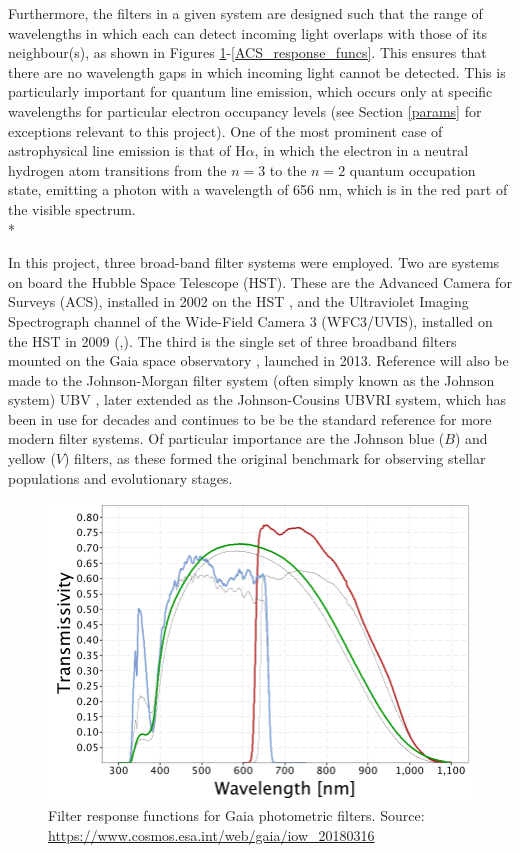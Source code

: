 \documentclass[12pt, a4paper]{report}
\begin{document}
Furthermore, the filters in a given system are designed such that the range of wavelengths in which each can detect incoming light overlaps with those of its neighbour(s), as shown in Figures \ref{Gaia_response_funcs}-\ref{ACS_response_funcs}. This ensures that there are no wavelength gaps in which incoming light cannot be detected. This is particularly important for quantum line emission, which occurs only at specific wavelengths for particular electron occupancy levels (see Section \ref{params} for exceptions relevant to this project). One of the most prominent case of astrophysical line emission is that of H$\alpha$, in which the electron in a neutral hydrogen atom transitions from the $n = 3$ to the $n = 2$ quantum occupation state, emitting a photon with a wavelength of 656 nm, which is in the red part of the visible spectrum. \\*

In this project, three broad-band filter systems were employed. Two are systems on board the Hubble Space Telescope (HST). These are the Advanced Camera for Surveys (ACS), installed in 2002 on the HST \citep{2007AJ....133.1658S}, and the Ultraviolet Imaging Spectrograph channel of the Wide-Field Camera 3 (WFC3/UVIS), installed on the HST in 2009 (\cite{2010wfc..rept...14K},\cite{2010SPIE.7731E..0ZM}). The third is the single set of three broadband filters mounted on the Gaia space observatory  \citep{2010A&A...523A..48J}, launched in 2013. Reference will also be made to the Johnson-Morgan filter system (often simply known as the Johnson system) UBV \cite{1953ApJ...117..313J}, later extended as the Johnson-Cousins UBVRI \cite{1990PASP..102.1181B} system, which has been in use for decades and continues to be be the standard reference for more modern filter systems. Of particular importance are the Johnson blue ($B$) and yellow ($V$) filters, as these formed the original benchmark for observing stellar populations and evolutionary stages.

\begin{figure}[h]
\begin{center}
\includegraphics[scale=0.5]{GaiaDR2Passbands.png}
\caption{Filter response functions for Gaia photometric filters. Source: \protect\url{https://www.cosmos.esa.int/web/gaia/iow_20180316}}
\label{Gaia_response_funcs}
\end{center}
\end{figure}
\end{document}

